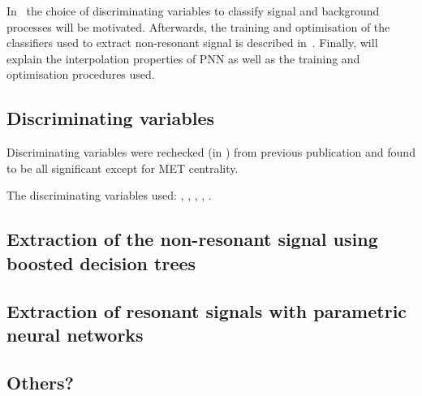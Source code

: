 In~ the choice of
discriminating variables to classify signal and background processes
will be motivated. Afterwards, the training and optimisation of the
classifiers used to extract non-resonant signal is described
in~. Finally,  will explain the
interpolation properties of PNN as well as the training and
optimisation procedures used. 


\subsection{Discriminating variables}
\label{sec:mva_discriminating variables}

Discriminating variables were rechecked (in \hadhad) from previous
publication and found to be all significant except for MET centrality.

The discriminating variables used: \mMMC, \mBB, \mHH, \dRtautau, \dRbb.


\subsection{Extraction of the non-resonant signal using boosted decision trees}
\label{sec:mva_smbdt}



\subsection{Extraction of resonant signals with parametric neural networks}
\label{sec:mva_pnn}




\subsection{Others?}



